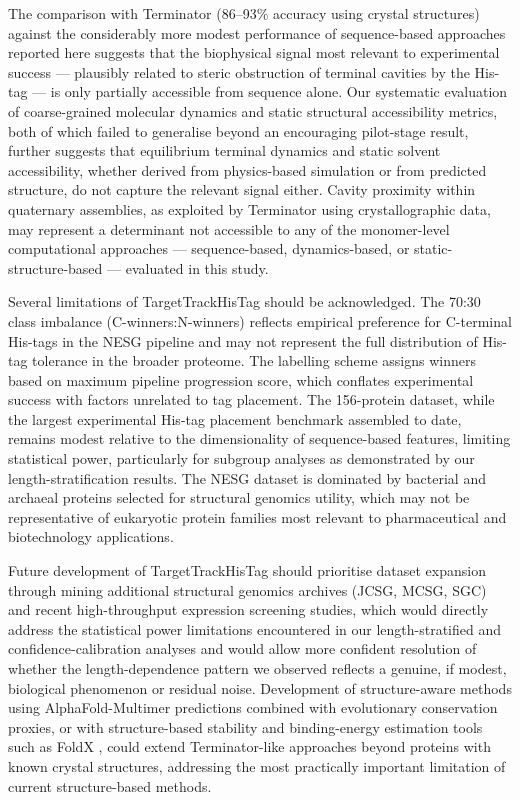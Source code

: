 \documentclass[unnumsec,webpdf,contemporary,large]{oup-authoring-template}
\begin{document}
The comparison with Terminator (86--93\% accuracy using crystal structures) against the considerably more modest performance of sequence-based approaches reported here suggests that the biophysical signal most relevant to experimental success --- plausibly related to steric obstruction of terminal cavities by the His-tag --- is only partially accessible from sequence alone. Our systematic evaluation of coarse-grained molecular dynamics and static structural accessibility metrics, both of which failed to generalise beyond an encouraging pilot-stage result, further suggests that equilibrium terminal dynamics and static solvent accessibility, whether derived from physics-based simulation or from predicted structure, do not capture the relevant signal either. Cavity proximity within quaternary assemblies, as exploited by Terminator using crystallographic data, may represent a determinant not accessible to any of the monomer-level computational approaches --- sequence-based, dynamics-based, or static-structure-based --- evaluated in this study.

Several limitations of TargetTrackHisTag should be acknowledged. The 70:30 class imbalance (C-winners:N-winners) reflects empirical preference for C-terminal His-tags in the NESG pipeline and may not represent the full distribution of His-tag tolerance in the broader proteome. The labelling scheme assigns winners based on maximum pipeline progression score, which conflates experimental success with factors unrelated to tag placement. The 156-protein dataset, while the largest experimental His-tag placement benchmark assembled to date, remains modest relative to the dimensionality of sequence-based features, limiting statistical power, particularly for subgroup analyses as demonstrated by our length-stratification results. The NESG dataset is dominated by bacterial and archaeal proteins selected for structural genomics utility, which may not be representative of eukaryotic protein families most relevant to pharmaceutical and biotechnology applications.

Future development of TargetTrackHisTag should prioritise dataset expansion through mining additional structural genomics archives (JCSG, MCSG, SGC) and recent high-throughput expression screening studies, which would directly address the statistical power limitations encountered in our length-stratified and confidence-calibration analyses and would allow more confident resolution of whether the length-dependence pattern we observed reflects a genuine, if modest, biological phenomenon or residual noise. Development of structure-aware methods using AlphaFold-Multimer predictions \citep{evans2022} combined with evolutionary conservation proxies, or with structure-based stability and binding-energy estimation tools such as FoldX \citep{schymkowitz2005}, could extend Terminator-like approaches beyond proteins with known crystal structures, addressing the most practically important limitation of current structure-based methods.
\end{document}
